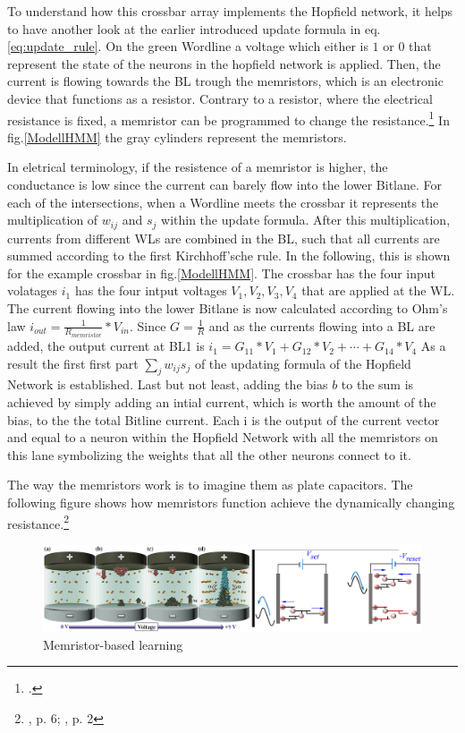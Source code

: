 To understand how this crossbar array implements the Hopfield network, it helps to have another look at the earlier introduced update formula in eq.\eqref{eq:update_rule}.
On the green Wordline a voltage which either is \( 1 \) or \( 0 \) that represent the state of the neurons in the hopfield network is applied.
Then, the current is flowing towards the BL trough the memristors, which is an electronic device that functions as a resistor.
Contrary to a resistor, where the electrical resistance is fixed, a memristor can be programmed to change the resistance.\footcite[cf][124]{sungPerspectiveReviewMemristive2018}
In fig.\ref{ModellHMM} the gray cylinders represent the memristors.

In eletrical terminology, if the resistence of a memristor is higher, the conductance is low since the current can barely flow into the lower Bitlane.
For each of the intersections, when a Wordline meets the crossbar it represents the multiplication of \(w_{ij}\) and \(s_j\) within the update formula.
After this multiplication, currents from different WLs are combined in the BL, such that all currents are summed according to the first Kirchhoff'sche rule.
In the following, this is shown for the example crossbar in fig.\ref{ModellHMM}.
The crossbar has the four input volatages \(i_{1}\) has the four intput voltages \(V_{1}, V_{2}, V_{3}, V_{4}\) that are applied at the WL.
The current flowing into the lower Bitlane is now calculated according to Ohm's law \( i_{out} = \frac{1}{R_{memristor}} * V_{in}\).
Since \( G = \frac{1}{R}\) and as the currents flowing into a BL are added, the output current at BL1 is \( i_{1} = G_{11}*V_1 + G_{12}*V_2 + \cdots + G_{14}*V_4\)
As a result the first first part \(\sum_j w_{ij} s_j\) of the updating formula of the Hopfield Network is established.
Last but not least, adding the bias \(b\) to the sum is achieved by simply adding an intial current, which is worth the amount of the bias, to the the total Bitline current.
Each i is the output of the current vector and equal to a neuron within the Hopfield Network with all the memristors on this lane symbolizing the weights that all the other neurons connect to it.

The way the memristors work is to imagine them as plate capacitors. 
The following figure shows how memristors function achieve the dynamically changing resistance.\footnote{\cite{changDirectObservationDualFilament2017}, p. 6; \cite{sungPerspectiveReviewMemristive2018}, p. 2}
\begin{figure}[H]
    \centering
    \includegraphics[width=0.9\linewidth]{graphics/Memristor_filoments.png}
    \caption{Memristor-based learning}
    \label{platecondensator}
\end{figure}

